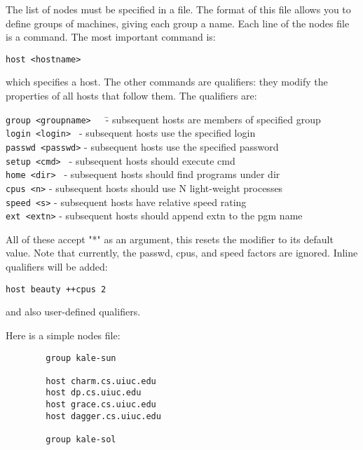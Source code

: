 \begin{itemize}
The list of nodes must be specified in a file.  The format of this file
allows you to define groups of machines, giving each group a name.
Each line of the nodes file is a command.  The most important command
is:

\begin{verbatim}
host <hostname>
\end{verbatim}

which specifies a host.  The other commands are qualifiers: they modify
the properties of all hosts that follow them.  The qualifiers are:


\begin{tabbing}
{\tt group <groupname>}~~~\= - subsequent hosts are members of specified group\\
{\tt login <login>  }     \> - subsequent hosts use the specified login\\
{\tt passwd <passwd>}     \> - subsequent hosts use the specified password\\
{\tt setup <cmd>  }       \> - subsequent hosts should execute cmd\\
{\tt home <dir> }         \> - subsequent hosts should find programs under dir\\
{\tt cpus <n>}            \> - subsequent hosts should use N light-weight processes\\
{\tt speed <s>}           \> - subsequent hosts have relative speed rating\\
{\tt ext <extn>}          \> - subsequent hosts should append extn to the pgm name\\
\end{tabbing}

All of these accept "*" as an argument, this resets the modifier to
its default value.  Note that currently, the passwd, cpus, and speed
factors are ignored.  Inline qualifiers will be added:

\begin{verbatim}
host beauty ++cpus 2
\end{verbatim}

and also user-defined qualifiers.

Here is a simple nodes file:

\begin{verbatim}
        group kale-sun
         
        host charm.cs.uiuc.edu
        host dp.cs.uiuc.edu
        host grace.cs.uiuc.edu
        host dagger.cs.uiuc.edu
         
        group kale-sol
         

\end{verbatim}
\end{itemize}
